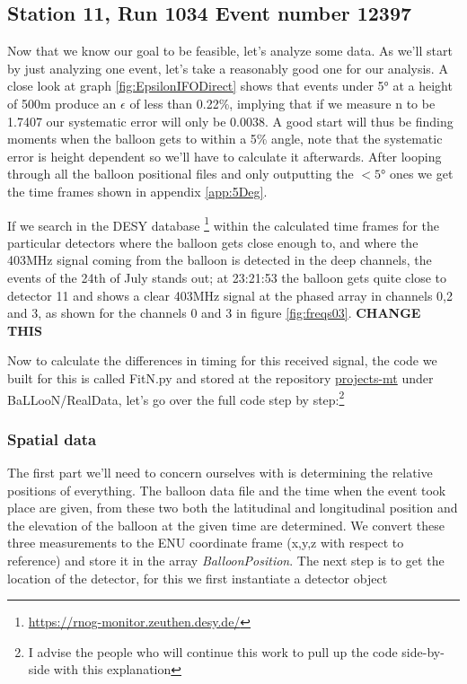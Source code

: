 \subsection{Station 11, Run 1034 Event number 12397}
Now that we know our goal to be feasible, let's analyze some data.  As we'll
start by just analyzing one event, let's take a reasonably good one for our analysis.
A close look at graph \ref{fig:EpsilonIFODirect} shows that events under 5° at
a height of 500m produce an $\epsilon$ of less than 0.22\%, implying that if we
measure n to be 1.7407 our systematic error will only be 0.0038.  A good start will
thus be finding moments when the balloon gets to within a 5\% angle, note that
the systematic error is height dependent so we'll have to calculate it afterwards.  After
looping through all the balloon positional files and only outputting the $<5$°
ones we get the time frames shown in appendix \ref{app:5Deg}.

If we search in the DESY database
\footnote{\url{https://rnog-monitor.zeuthen.desy.de/}} within the calculated
time frames for the particular detectors where the balloon gets close enough to,
and where the 403MHz signal coming from the balloon is detected in the deep channels, the events of the 24th
of July stands out; at 23:21:53 the balloon gets quite close to detector 11 and shows a
clear 403MHz signal at the phased array in channels 0,2 and 3, as shown for the channels 0 and 3 in
figure \ref{fig:freqs03}.
\textbf{CHANGE THIS}

Now to calculate the differences in timing for this received signal, the code
we built for this is called FitN.py and stored at the repository
\href{https://github.com/arthuradriaens-code/projects-mt.git}{projects-mt}
under BaLLooN/RealData, let's go over the full code step by step:\footnote{I advise 
the people who will continue this work to pull up the code side-by-side with this 
explanation}

\subsubsection{Spatial data}
The first part we'll need to concern ourselves with is determining the relative
positions of everything. The balloon data file and the time when the event took
place are given, from these two both the latitudinal and longitudinal position
and the elevation of the balloon at the given time are determined. We convert
these three measurements to the ENU coordinate frame (x,y,z with respect to
reference) and store it in the array \textit{BalloonPosition}. The next step is
to get the location of the detector, for this we first instantiate a detector
object 

